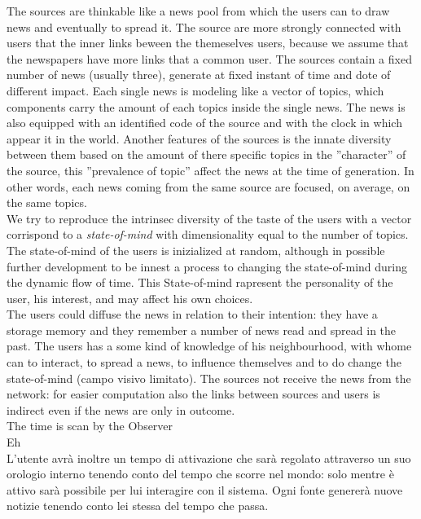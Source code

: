 \documentclass[11pt]{article} %
\begin{document}
The sources are thinkable like a news pool from which the users can to draw news and eventually to spread it. The source are more strongly connected with users that the inner links beween the themeselves users, because we assume that the newspapers have more links that a common user.
The sources contain a fixed number of news (usually three), generate at fixed instant of time and dote of different impact. Each single news is modeling like a vector of topics, which components carry the amount of each topics inside the single news. The news is also equipped with an identified code of the source and with the clock in which appear it in the world. 
Another features of the sources is the innate diversity between them based on the amount of there specific topics in the ''character'' of the source, this ''prevalence of topic'' affect the news at the time of generation. In other words, each news coming from the same source are focused, on average, on the same topics. \\
We try to reproduce the intrinsec diversity of the taste of the users with a vector corrispond to a {\itshape state-of-mind} with dimensionality equal to the number of topics. The state-of-mind of the users is inizialized at random, although in possible further development to be innest a process to changing the state-of-mind during the dynamic flow of time. This State-of-mind rapresent the personality of the user, his interest, and may affect his own choices.
\\
The users could diffuse the news in relation to their intention: they have a storage memory and they remember a number of news read and spread in the past.
The users has a some kind of knowledge of his neighbourhood, with whome can to interact, to spread a news, to influence themselves and to do change the state-of-mind (campo visivo limitato). The sources not receive the news from the network: for easier computation also the links between sources and users is indirect even if the news are only in outcome.
\\
The time is scan by the Observer\\
Eh
\\
L’utente avrà inoltre un tempo di attivazione che sarà regolato attraverso un suo orologio interno
tenendo conto del tempo che scorre nel mondo: solo mentre è attivo sarà possibile per lui interagire
con il sistema. 
Ogni fonte genererà nuove notizie tenendo conto lei stessa del
tempo che passa.
\end{document}

